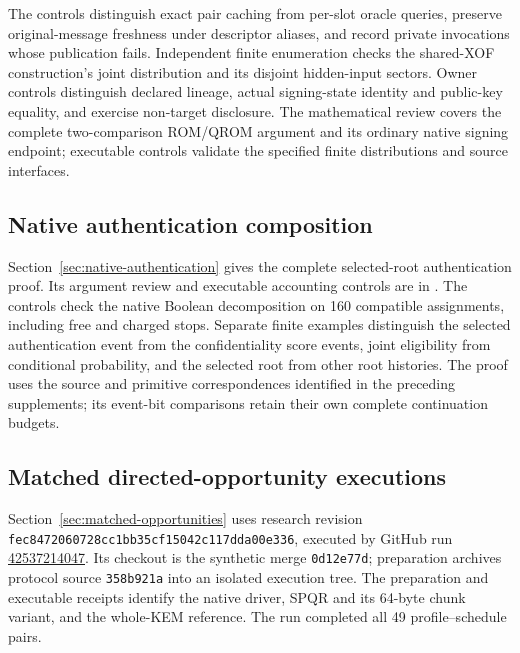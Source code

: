 The controls distinguish exact pair caching from per-slot oracle queries,
preserve original-message freshness under descriptor aliases, and record
private invocations whose publication fails. Independent finite enumeration
checks the shared-XOF construction's joint distribution and its disjoint
hidden-input sectors. Owner controls distinguish declared lineage, actual
signing-state identity and public-key equality, and exercise non-target
disclosure. The mathematical review covers the complete two-comparison
ROM/QROM argument and its ordinary native signing endpoint; executable
controls validate the specified finite distributions and source interfaces.

\subsection{Native authentication composition}
\label{app:native-authentication}

Section~\ref{sec:native-authentication} gives the complete selected-root
authentication proof. Its argument review and executable accounting
controls are in .
The controls check the native Boolean decomposition on 160 compatible
assignments, including free and charged stops. Separate finite examples
distinguish the selected authentication event from the confidentiality
score events, joint eligibility from conditional probability, and the
selected root from other root histories. The proof uses the source and
primitive correspondences identified in the preceding supplements; its
event-bit comparisons retain their own complete continuation budgets.

\subsection{Matched directed-opportunity executions}
\label{app:matched-comparison}

Section~\ref{sec:matched-opportunities} uses research revision
\texttt{fec8472060728cc1bb35cf15042c117dda00e336}, executed by GitHub run
\href{https://github.com/billlza/q-periapt/actions/runs/42537214047}{42537214047}.
Its checkout is the synthetic merge \texttt{0d12e77d}; preparation archives
protocol source \texttt{358b921a} into an isolated execution tree. The
preparation and executable receipts identify the native driver, SPQR and its
64-byte chunk variant, and the whole-KEM reference. The run completed all
49 profile--schedule pairs.

